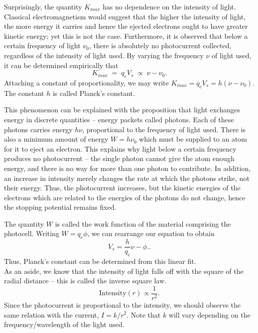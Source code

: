 \documentclass[11pt]{article}
\begin{document}
        Surprisingly, the quantity $K_{max}$ has no dependence on the intensity of light. Classical electromagnetism would suggest that
        the higher the intensity of light, the more energy it carries and hence the ejected electrons ought to have greater kinetic energy;
        yet this is not the case. Furthermore, it is observed that below a certain frequency of light $\nu_0$, there is absolutely no
        photocurrent collected, regardless of the intensity of light used. By varying the frequency $\nu$ of light used, it can be determined
        empirically that
        \[
                K_{max} \;=\; q_eV_s \;\propto\; \nu - \nu_0.
        \]
        Attaching a constant of proportionality, we may write $K_{max} = q_eV_s = h(\nu - \nu_0)$. The constant $h$ is called Planck's constant.

        This phenomenon can be explained with the proposition that light exchanges energy in discrete quantities -- energy packets called
        photons. Each of these photons carries energy $h\nu$, proportional to the frequency of light used. There is also a minimum amount of
        energy $W = h\nu_0$ which must be supplied to an atom for it to eject an electron. This explains why light below a certain frequency
        produces no photocurrent -- the single photon cannot give the atom enough energy, and there is no way for more than one photon to 
        contribute. In addition, an increase in intensity merely changes the rate at which the photons strike, not their energy.
        Thus, the photocurrent increases, but the kinetic energies of the electrons which are related to the energies of the photons
        do not change, hence the stopping potential remains fixed.

        The quantity $W$ is called the work function of the material comprising the photocell. Writing $W = q_e \phi$, we can rearrange
        our equation to obtain
        \[
                V_s = \frac{h}{q_e}\nu - \phi. \tag{\star}\label{eq:fit}.
        \]
        Thus, Planck's constant can be determined from this linear fit. \\

        As an aside, we know that the intensity of light falls off with the square of the radial distance -- this is called the inverse square law.
        \[
                \text{Intensity}(r) \propto \frac{1}{r^2}.
        \]
        Since the photocurrent is proportional to the intensity, we should observe the same relation with the current, $I = k /r^2$.
        Note that $k$ will vary depending on the frequency/wavelength of the light used.
        
\end{document}
